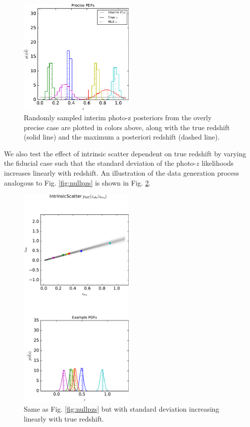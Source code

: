 \documentclass[preprint]{aastex}
\begin{document}
\begin{figure}
\includegraphics[width=0.5\textwidth]{figs/sig1/samplepzs.pdf}
\caption{Randomly sampled interim photo-z posteriors from the overly precise 
case are plotted in colors above, along with the true redshift (solid line) and 
the maximum a posteriori redshift (dashed line).}
\label{fig:sigspzs}
\end{figure}

We also test the effect of intrinsic scatter dependent on true redshift by 
varying the fiducial case such that the standard deviation of the photo-$z$ 
likelihoods increases linearly with redshift.  An illustration of the data 
generation process analogous to Fig. \ref{fig:nullpzs} is shown in Fig. 
\ref{fig:varspzs}.

\begin{figure}
\includegraphics[width=0.5\textwidth]{figs/vars/zobsvztru.pdf}
\caption{Same as Fig. \ref{fig:nullpzs} but with standard deviation increasing 
linearly with true redshift.}
\label{fig:varspzs}
\end{figure}
\end{document}
